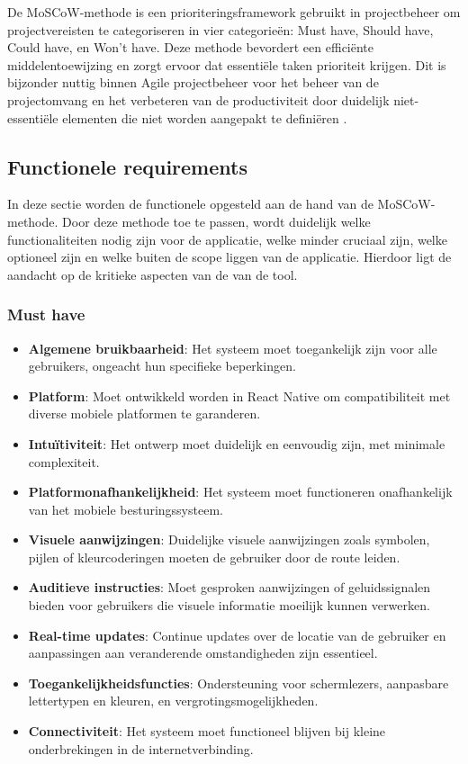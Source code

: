 De MoSCoW-methode is een prioriteringsframework gebruikt in projectbeheer om projectvereisten te categoriseren in vier categorieën: Must have, Should have, Could have, en Won't have. Deze methode bevordert een efficiënte middelentoewijzing en zorgt ervoor dat essentiële taken prioriteit krijgen. Dit is bijzonder nuttig binnen Agile projectbeheer voor het beheer van de projectomvang en het verbeteren van de productiviteit door duidelijk niet-essentiële elementen die niet worden aangepakt te definiëren \autocite{Brush2023}.

\subsection{Functionele requirements}
\label{sec:functionele-requirements}

In deze sectie worden de functionele opgesteld aan de hand van de MoSCoW-methode. Door deze methode toe te passen, wordt duidelijk welke functionaliteiten nodig zijn voor de applicatie, welke minder cruciaal zijn, welke optioneel zijn en welke buiten de scope liggen van de applicatie. Hierdoor ligt de aandacht op de kritieke aspecten van de van de tool.

\subsubsection{Must have}
\begin{itemize}
    \item \textbf{Algemene bruikbaarheid}: Het systeem moet toegankelijk zijn voor alle gebruikers, ongeacht hun specifieke beperkingen.
    \item \textbf{Platform}: Moet ontwikkeld worden in React Native om compatibiliteit met diverse mobiele platformen te garanderen.
    \item \textbf{Intuïtiviteit}: Het ontwerp moet duidelijk en eenvoudig zijn, met minimale complexiteit.
    \item \textbf{Platformonafhankelijkheid}: Het systeem moet functioneren onafhankelijk van het mobiele besturingssysteem.
    \item \textbf{Visuele aanwijzingen}: Duidelijke visuele aanwijzingen zoals symbolen, pijlen of kleurcoderingen moeten de gebruiker door de route leiden.
    \item \textbf{Auditieve instructies}: Moet gesproken aanwijzingen of geluidssignalen bieden voor gebruikers die visuele informatie moeilijk kunnen verwerken.
    \item \textbf{Real-time updates}: Continue updates over de locatie van de gebruiker en aanpassingen aan veranderende omstandigheden zijn essentieel.
    \item \textbf{Toegankelijkheidsfuncties}: Ondersteuning voor schermlezers, aanpasbare lettertypen en kleuren, en vergrotingsmogelijkheden.
    \item \textbf{Connectiviteit}: Het systeem moet functioneel blijven bij kleine onderbrekingen in de internetverbinding.
\end{itemize}

